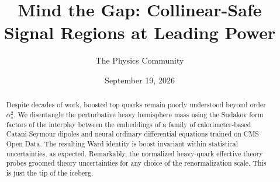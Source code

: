 \documentclass[11pt]{article}
\title{Mind the Gap: Collinear-Safe Signal Regions at Leading Power}
\author{The Physics Community}
\date{September 19, 2026}
\begin{document}
\maketitle
\begin{abstract}
Despite decades of work, boosted top quarks remain poorly understood
beyond order $\alpha_s^2$. We disentangle the perturbative heavy
hemisphere mass using the Sudakov form factors of the interplay between
the embeddings of a family of calorimeter-based Catani-Seymour dipoles
and neural ordinary differential equations trained on CMS Open Data. The
resulting Ward identity is boost invariant within statistical
uncertainties, as expected. Remarkably, the normalized heavy-quark
effective theory probes groomed theory uncertainties for any choice of
the renormalization scale. This is just the tip of the iceberg.
\end{abstract}
\tableofcontents





\nocite{*}


\end{document}
